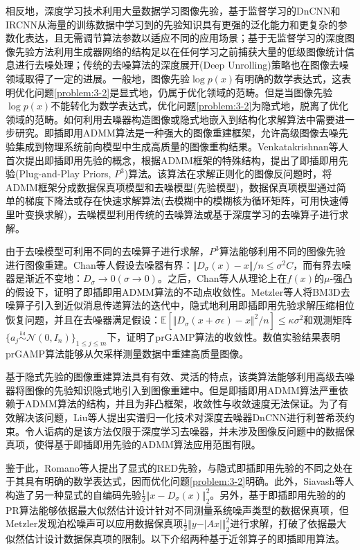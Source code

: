 相反地，深度学习技术利用大量数据学习图像先验，基于监督学习的DnCNN和IRCNN从海量的训练数据中学习到的先验知识具有更强的泛化能力和更复杂的参数化表达，且无需调节算法参数以适应不同的应用场景\supercite{Kai,ZhangKai}；基于无监督学习的深度图像先验方法利用生成器网络的结构足以在任何学习之前捕获大量的低级图像统计信息进行去噪处理；传统的去噪算法的深度展开(Deep Unrolling)策略也在图像去噪领域取得了一定的进展\supercite{Yan,Chenyang,Hasselt,Schaul,Bellemare,Matteo,Dabney1,Dabney2,Volodymyr}。一般地，图像先验$\log{p(x)}$有明确的数学表达式，这表明优化问题\ref{problem:3-2}是显式地，仍属于优化领域的范畴。但是当图像先验$\log{p(x)}$不能转化为数学表达式，优化问题\eqref{problem:3-2}为隐式地，脱离了优化领域的范畴。如何利用去噪器构造图像或隐式地嵌入到结构化求解算法中需要进一步研究。即插即用ADMM算法是一种强大的图像重建框架，允许高级图像去噪先验集成到物理系统前向模型中生成高质量的图像重构结果。Venkatakrishnan等人首次提出即插即用先验的概念，根据ADMM框架的特殊结构，提出了即插即用先验(Plug-and-Play Priors, $P^3$)算法\supercite{Stanley}。该算法在求解正则化的图像反问题时，将ADMM框架分成数据保真项模型和去噪模型(先验模型)，数据保真项模型通过简单的梯度下降法或存在快速求解算法(去模糊中的模糊核为循环矩阵，可用快速傅里叶变换求解)，去噪模型利用传统的去噪算法或基于深度学习的去噪算子进行求解。 

由于去噪模型可利用不同的去噪算子进行求解，$P^3$算法能够利用不同的图像先验进行图像重建。Chan等人假设去噪器有界：$\Vert{D_{\sigma}(x)-x}\Vert/n\leq{\sigma^2C}$，而有界去噪器是渐近不变地：$D_{\sigma}\to{0}(\sigma\to{0})$。之后，Chan等人从理论上在$f(x)$的$\mu$-强凸的假设下，证明了即插即用ADMM算法的不动点收敛性\supercite{ZhangKai}。Metzler等人将BM3D去噪算子引入到近似消息传递算法的迭代中，隐式地利用即插即用先验求解压缩相位恢复问题，并且在去噪器满足假设：$\mathbb{E}\left[\Vert{D_{\sigma}(x+\sigma\epsilon)-x}\Vert^2/n\right]\leq{\kappa\sigma^2}$和观测矩阵$\{a_j\overset{\underset{\mathrm{iid}}{}}{\sim}\mathcal{N}(0,I_n)\}_{1\leq {j\leq{m}}}$下，证明了prGAMP算法的收敛性\supercite{Metzler4}。数值实验结果表明prGAMP算法能够从欠采样测量数据中重建高质量图像。

基于隐式先验的图像重建算法具有有效、灵活的特点，该类算法能够利用高级去噪器将图像的先验知识隐式地引入到图像重建中。但是即插即用ADMM算法严重依赖于ADMM算法的结构，并且为非凸框架，收敛性与收敛速度无法保证。为了有效解决该问题，Liu等人提出实谱归一化技术对深度去噪器DnCNN进行利普希茨约束\supercite{Ernest}。令人诟病的是该方法仅限于深度学习去噪器，并未涉及图像反问题中的数据保真项，使得基于即插即用先验的ADMM算法应用范围有限。

鉴于此，Romano等人提出了显式的RED先验，与隐式即插即用先验的不同之处在于其具有明确的数学表达式，因而优化问题\eqref{problem:3-2}明确。此外，Siavash等人构造了另一种显式的自编码先验$\frac{1}{2}\Vert{x-D_{\sigma}(x)}\Vert_2^2$\supercite{Siavash,Yankun,Zhang}。另外，基于即插即用先验的的PR算法能够依据最大似然估计设计针对不同测量系统噪声类型的数据保真项，但Metzler发现泊松噪声可以应用数据保真项$\frac{1}{2}{\Vert{y-\vert{Ax}\vert}\Vert_2^2}$进行求解，打破了依据最大似然估计设计数据保真项的限制。以下介绍两种基于近邻算子的即插即用算法。

